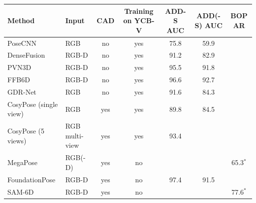 \begin{tabular}{llccccc}
\hline
Method & Input & CAD & Training on YCB-V & ADD-S AUC & ADD(-S) AUC & BOP AR \\
\hline
PoseCNN & RGB & no & yes & 75.8 & 59.9 &  \\
DenseFusion & RGB-D & no & yes & 91.2 & 82.9 &  \\
PVN3D & RGB-D & no & yes & 95.5 & 91.8 &  \\
FFB6D & RGB-D & no & yes & 96.6 & 92.7 &  \\
GDR-Net & RGB & no & yes & 91.6 & 84.3 &  \\
CosyPose (single view) & RGB & yes & yes & 89.8 & 84.5 &  \\
CosyPose (5 views) & RGB multi-view & yes & yes & 93.4 &  &  \\
MegaPose & RGB(-D) & yes & no &  &  & 65.3$^{*}$ \\
FoundationPose & RGB-D & yes & no & 97.4 & 91.5 &  \\
SAM-6D & RGB-D & yes & no &  &  & 77.6$^{*}$ \\
\hline
\end{tabular}
